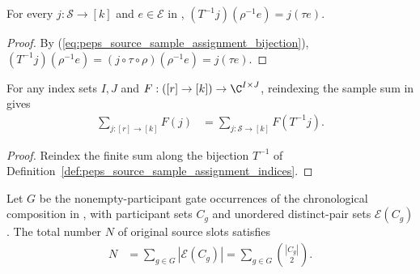 \begin{lemma}
    \label{thm:peps_source_sample_assignment_occurrence}
    \leanok
    For every $j:\mathcal S\to[k]$ and $e\in\mathcal E$ in
    \cite[proof of Theorem~5.2]{OpenAI2026PolynomialPEPS},
    $(T^{-1}j)(\rho^{-1}e)=j(\tau e)$.
\end{lemma}

\begin{proof}\leanok
    By (\ref{eq:peps_source_sample_assignment_bijection}),
    $(T^{-1}j)(\rho^{-1}e)=(j\circ\tau\circ\rho)(\rho^{-1}e)=j(\tau e)$.
\end{proof}

\begin{lemma}
    \label{thm:peps_source_sample_assignment_sum}
    \leanok
    For any index sets $I,J$ and $F:([r]\to[k])\to\C^{I\times J}$, reindexing
    the sample sum in \cite[proof of Theorem~5.2]{OpenAI2026PolynomialPEPS}
    gives
    \begin{align}
        \sum_{j:[r]\to[k]}F(j)
         & =\sum_{j:\mathcal S\to[k]}F(T^{-1}j).
        \label{eq:peps_source_sample_assignment_sum}
    \end{align}
\end{lemma}

\begin{proof}\leanok
    Reindex the finite sum along the bijection $T^{-1}$ of
    Definition~\ref{def:peps_source_sample_assignment_indices}.
\end{proof}


\begin{lemma}
    \label{thm:peps_original_source_sample_count}
    \leanok
    Let $G$ be the nonempty-participant gate occurrences of the chronological
    composition in \cite[proof of Theorem~5.2]{OpenAI2026PolynomialPEPS}, with
    participant sets $C_g$ and unordered distinct-pair sets $\mathcal E(C_g)$.
    The total number $N$ of original source slots satisfies
    \begin{align}
        N & =\sum_{g\in G}|\mathcal E(C_g)|
        =\sum_{g\in G}\binom{|C_g|}{2}.
        \label{eq:peps_original_source_sample_count}
    \end{align}
\end{lemma}

